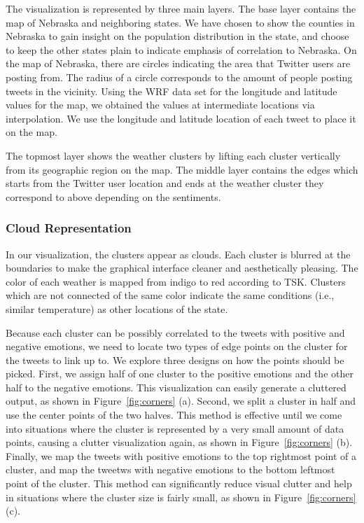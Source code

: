 The visualization is represented by three main layers. The base layer contains the map of Nebraska and neighboring states. We have chosen to show the counties in Nebraska to gain insight on the population distribution in the state, and choose to keep the other states plain to indicate emphasis of correlation to Nebraska. On the map of Nebraska, there are circles indicating the area that Twitter users are posting from. The radius of a circle corresponds to the amount of people posting tweets in the vicinity. Using the WRF data set for the longitude and latitude values for the map, we obtained the values at intermediate locations via interpolation. We use the longitude and latitude location of each tweet to place it on the map.

The topmost layer shows the weather clusters by lifting each cluster vertically from its geographic region on the map. The middle layer contains the edges which starts from the Twitter user location and ends at the weather cluster they correspond to above depending on the sentiments. 

\subsubsection{Cloud Representation}

In our visualization, the clusters appear as clouds. Each cluster is blurred at the boundaries to make the graphical interface cleaner and aesthetically pleasing. The color of each weather is mapped from indigo to red according to TSK. Clusters which are not connected of the same color indicate the same conditions (i.e., similar temperature) as other locations of the state. %

Because each cluster can be possibly correlated to the tweets with positive and negative emotions, we need to locate two types of edge points on the cluster for the tweets to link up to. We explore three designs on how the points should be picked. First, we assign half of one cluster to the positive emotions and the other half to the negative emotions. This visualization can easily generate a cluttered output, as shown in Figure~\ref{fig:corners} (a). Second, we split a cluster in half and use the center points of the two halves. This method is effective until we come into situations where the cluster is represented by a very small amount of data points, causing a clutter visualization again, as shown in Figure~\ref{fig:corners} (b). Finally, we map the tweets with positive emotions to the top rightmost point of a cluster, and map the tweetws with negative emotions to the bottom leftmost point of the cluster. This method can significantly reduce visual clutter and help in situations where the cluster size is fairly small, as shown in Figure~\ref{fig:corners} (c). 


